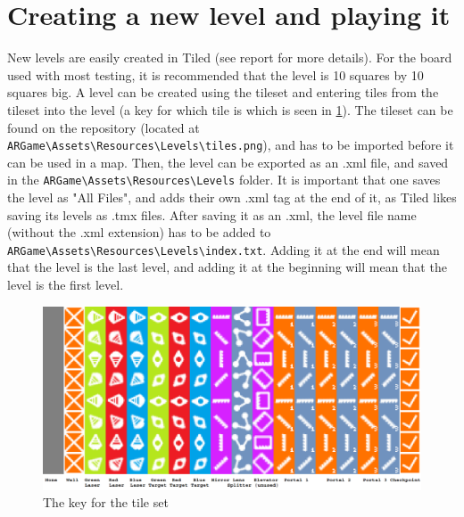 \documentclass[]{report}
\begin{document}
\section*{Creating a new level and playing it}
New levels are easily created in Tiled (see report for more details). For the board used with most testing,
it is recommended that the level is 10 squares by 10 squares big. A level can be
created using the tileset and entering tiles from the tileset into the level
(a key for which tile is which is seen in \ref{fig:tilekey}). The tileset can be
found on the repository (located at \verb#ARGame\Assets\Resources\Levels\tiles.png#), and has to be imported before it can be used in a map. Then, the 
level can be exported as an .xml file, and saved in the \verb#ARGame\Assets\Resources\Levels# folder.
It is important that one saves the level as "All Files", and adds their own
.xml tag at the end of it, as Tiled likes saving its levels as .tmx files.
After saving it as an .xml, the level file name (without the .xml extension)
has to be added to \verb#ARGame\Assets\Resources\Levels\index.txt#. Adding it at the end will mean that the level
is the last level, and adding it at the beginning will mean that the level is
the first level.
\begin{figure}[!ht]
    \centering
    \includegraphics[scale = 0.3]{TileKey}
    \caption{The key for the tile set}
    \label{fig:tilekey}
\end{figure}
\end{document}

